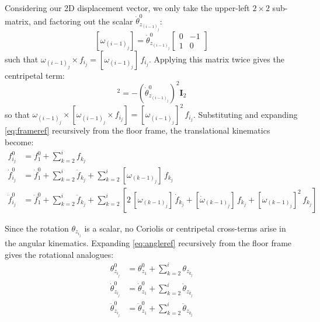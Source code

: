 Considering our 2D displacement vector, we only take the upper-left $2\times2$ 
sub-matrix, and factoring out the scalar $\dot{\theta}^{0}_{z_{(i-1)_j}}$:
\begin{equation} \label{eq:skew}
    [\omega_{(i-1)_j}] = \dot{\theta}^{0}_{z_{(i-1)_j}}
    \begin{bmatrix} 0 & -1 \\ 1 & 0 \end{bmatrix}
\end{equation}
such that $\omega_{(i-1)_j} \times f_{i_j} = [\omega_{(i-1)_j}]\,f_{i_j}$. 
Applying this matrix twice gives the centripetal term:
\begin{equation}
    [\omega_{(i-1)_j}]^2 = -\left(\dot{\theta}^{0}_{z_{(i-1)_j}}\right)^2 \mathbf{I}_2
\end{equation}
so that $\omega_{(i-1)_j} \times [\omega_{(i-1)_j} \times f_{i_j}] =
[\omega_{(i-1)_j}]^2\,f_{i_j}$. Substituting and expanding
\eqref{eq:frameref} recursively from the floor frame, the translational kinematics become:
\begin{align}
    f^{0}_{i_j}
        &= f^{0}_{1} + \sum^{i}_{k=2} f_{k_j}
        \label{eq:pos_expanded} \\
    \dot{f}^{0}_{i_j}
        &= \dot{f}^{0}_{1} + \sum^{i}_{k=2} \dot{f}_{k_j}
         + \sum^{i}_{k=2} [\omega_{(k-1)_j}]\, f_{k_j}
        \label{eq:vel_expanded} \\
    \ddot{f}^{0}_{i_j}
        &= \ddot{f}^{0}_{1} + \sum^{i}_{k=2} \ddot{f}_{k_j}
         + \sum^{i}_{k=2} \left[
             2\,[\omega_{(k-1)_j}]\,\dot{f}_{k_j}
             + [\dot{\omega}_{(k-1)_j}]\,f_{k_j}
             + [\omega_{(k-1)_j}]^2\,f_{k_j}
         \right]
        \label{eq:acc_expanded}
\end{align}

Since the rotation $\theta_{z_{i_j}}$ is a scalar, no Coriolis or centripetal cross-terms arise in the angular kinematics. Expanding \eqref{eq:angleref} recursively from the floor frame gives the rotational analogues:
\begin{align}
    \theta^{0}_{z_{i_j}}
        &= \theta^{0}_{z_1} + \sum^{i}_{k=2} \theta_{z_{k_j}}
        \label{eq:angle_expanded} \\
    \dot{\theta}^{0}_{z_{i_j}}
        &= \dot{\theta}^{0}_{z_1} + \sum^{i}_{k=2} \dot{\theta}_{z_{k_j}}
        \label{eq:angvel_expanded} \\
    \ddot{\theta}^{0}_{z_{i_j}}
        &= \ddot{\theta}^{0}_{z_1} + \sum^{i}_{k=2} \ddot{\theta}_{z_{k_j}}
        \label{eq:angacc_expanded}
\end{align}

